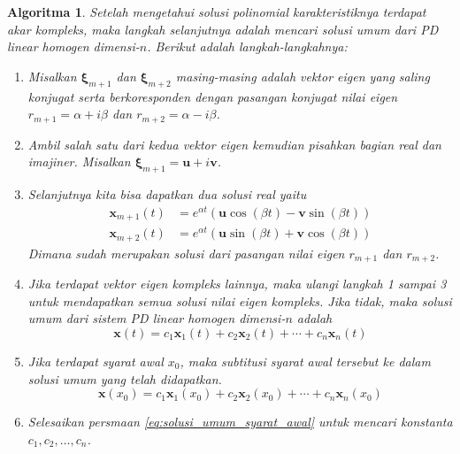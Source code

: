 \documentclass[a4paper]{article}
\theoremstyle{definisi}
\newtheorem{algoritma}{Algoritma}[subsection]
\newcommand{\bfxi}{\boldsymbol{\xi}}
\numberwithin{equation}{section}
\begin{document}
  \begin{algoritma}\label{algoritma}
  Setelah mengetahui solusi polinomial karakteristiknya terdapat akar kompleks, maka langkah selanjutnya adalah mencari solusi umum dari PD linear homogen dimensi-$n$. Berikut adalah langkah-langkahnya:
  \begin{enumerate}[label=Langkah \arabic*: ,leftmargin=*]
    \item Misalkan $\bfxi_{m+1}$ dan $\bfxi_{m+2}$ masing-masing adalah vektor eigen yang saling konjugat serta berkoresponden dengan pasangan konjugat nilai eigen $r_{m+1} = \alpha + i\beta$ dan $r_{m+2} = \alpha - i\beta$.
    \item Ambil salah satu dari kedua vektor eigen kemudian pisahkan bagian real dan imajiner. Misalkan $\bfxi_{m+1} = \mathbf{u} + i\mathbf{v}$.
    \item Selanjutnya kita bisa dapatkan dua solusi real yaitu
    \begin{equation}\label{eq:solusi_vektor_eigen}
      \begin{split}
        \mathbf{x}_{m+1}(t) &= e^{\alpha t}(\mathbf{u}\cos(\beta t) - \mathbf{v}\sin(\beta t))\\
        \mathbf{x}_{m+2}(t) &= e^{\alpha t}(\mathbf{u}\sin(\beta t) + \mathbf{v}\cos(\beta t))
      \end{split}
    \end{equation}
    Dimana sudah merupakan solusi dari pasangan nilai eigen $r_{m+1}$ dan $r_{m+2}$.
    \item Jika terdapat vektor eigen kompleks lainnya, maka ulangi langkah 1 sampai 3 untuk mendapatkan semua solusi nilai eigen kompleks. Jika tidak, maka solusi umum dari sistem PD linear homogen dimensi-$n$ adalah
    \begin{equation}
      \mathbf{x}(t) = c_1\mathbf{x}_1(t) + c_2\mathbf{x}_2(t) + \cdots + c_n\mathbf{x}_n(t)
    \end{equation}
    \item Jika terdapat syarat awal $x_0$, maka subtitusi syarat awal tersebut ke dalam solusi umum yang telah didapatkan.
    \begin{equation}\label{eq:solusi_umum_syarat_awal}
      \mathbf{x}(x_0) = c_1\mathbf{x}_1(x_0) + c_2\mathbf{x}_2(x_0) + \cdots + c_n\mathbf{x}_n(x_0)
    \end{equation}
    \item Selesaikan persmaan \eqref{eq:solusi_umum_syarat_awal} untuk mencari konstanta $c_1, c_2, \ldots, c_n$. 
  \end{enumerate}
  \end{algoritma}
\end{document}
